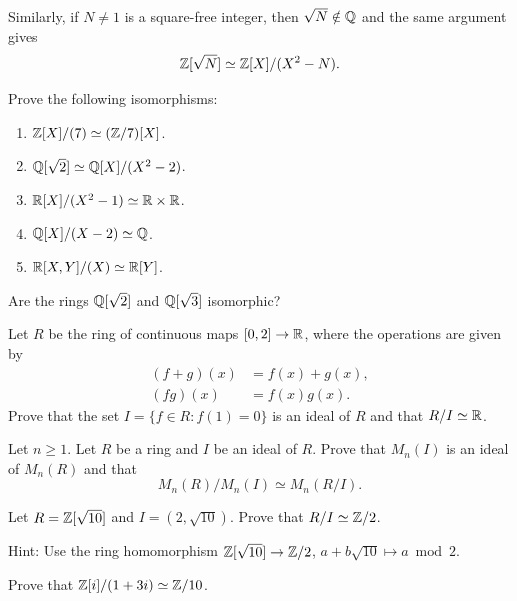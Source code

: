 Similarly, if $N\ne1$ is a square-free integer, then 
$\sqrt{N}\notin\mathbb{Q}$ and
the same argument gives
\[
\mathbb{Z}[\sqrt{N}]\simeq\mathbb{Z}[X]/(X^2-N).
\]

\begin{exercise}
\label{xca:ring_isos}
Prove the following isomorphisms:
\begin{enumerate}
	\item $\mathbb{Z}[X]/(7)\simeq (\mathbb{Z}/7)[X]$.
	\item $\mathbb{Q}[\sqrt{2}]\simeq\mathbb{Q}[X]/(X^2-2)$.
	\item $\mathbb{R}[X]/(X^2-1)\simeq\mathbb{R}\times\mathbb{R}$.
	\item $\mathbb{Q}[X]/(X-2)\simeq\mathbb{Q}$.
	\item $\mathbb{R}[X,Y]/(X)\simeq\mathbb{R}[Y]$. 
\end{enumerate}
\end{exercise}

\begin{exercise}
\label{xca:sqrt2and3}
Are the rings $\mathbb{Q}[\sqrt{2}]$ and $\mathbb{Q}[\sqrt{3}]$ isomorphic?	
\end{exercise}

\begin{exercise}
\label{xca:continuous}
	Let $R$ be the ring of continuous maps $[0,2]\to\mathbb{R}$, where the operations are given by 
	\begin{align*}	    
	(f+g)(x)&=f(x)+g(x),\\
	(fg)(x)&=f(x)g(x).
	\end{align*}
	Prove that the set 
	$I=\{f\in R:f(1)=0\}$ is an ideal of $R$ and that $R/I\simeq\mathbb{R}$.   	
\end{exercise}

\begin{exercise}
\label{xca:matrices}
	Let $n\geq1$. 
	Let $R$ be a ring and $I$ be an ideal of $R$. Prove that $M_n(I)$ is an ideal 
	of $M_n(R)$ and that 
    \[
    M_n(R)/M_n(I)\simeq M_n(R/I).
    \]
\end{exercise}

\begin{exercise}
    \label{xca:Z[sqrt10]/(2,sqrt10)}
    Let $R=\mathbb{Z}[\sqrt{10}]$ and $I=(2,\sqrt{10})$. Prove that $R/I\simeq\mathbb{Z}/2$. 	
\end{exercise}

Hint: Use the ring homomorphism $\mathbb{Z}[\sqrt{10}]\to\mathbb{Z}/2$, $a+b\sqrt{10}\mapsto a\bmod 2$. 	

\begin{exercise}
\label{xca:Z[i]/(1+3i)}
	Prove that $\mathbb{Z}[i]/(1+3i)\simeq\mathbb{Z}/10$. 	
\end{exercise}

